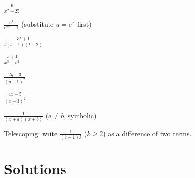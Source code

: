 \begin{problems}
  \item $\displaystyle\frac{6}{x^{2}-25}$
  \item $\displaystyle\frac{\mathrm{e}^{x}}{\mathrm{e}^{2x}-1}$
        (substitute $u=\mathrm{e}^{x}$ first)
  \item $\displaystyle\frac{3t+1}{t(t-1)(t-2)}$
  \item $\displaystyle\frac{x+4}{x^{3}+x^{2}}$
  \item $\displaystyle\frac{2y-3}{(y+1)^{2}}$
  \item $\displaystyle\frac{4x-5}{(x-3)^{2}}$
  \item $\displaystyle\frac{1}{(x+a)(x+b)}$ ($a\neq b$, symbolic)
  \item Telescoping: write $\displaystyle\frac{1}{(k-1)k}$ ($k\ge 2$) as a
        difference of two terms.
\end{problems}

\section{Solutions}

